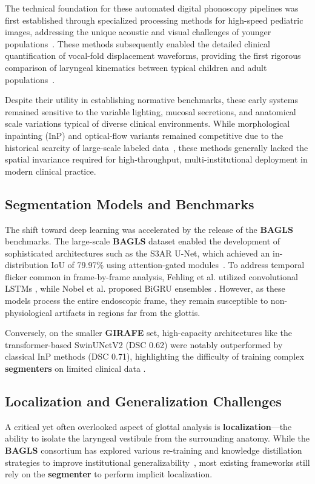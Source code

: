 \documentclass[preprint,12pt]{elsarticle}
\newcommand{\girafe}{\textbf{GIRAFE}}
\newcommand{\bagls}{\textbf{BAGLS}}
\begin{document}
The technical foundation for these automated digital phonoscopy pipelines was first
established through specialized processing methods for high-speed pediatric images,
addressing the unique acoustic and visual challenges of younger
populations~\cite{unnikrishnan2012photonic}. These methods subsequently enabled
the detailed clinical quantification of vocal-fold displacement waveforms,
providing the first rigorous comparison of laryngeal kinematics between typical children and adult populations~\cite{patel2015kinematic}. 

Despite their utility in establishing normative benchmarks, these early systems remained sensitive
to the variable lighting, mucosal secretions, and anatomical scale variations typical of diverse
clinical environments. While morphological inpainting (InP) and optical-flow variants remained
competitive due to the historical scarcity of large-scale labeled data~\cite{andrade2025datainbrief}, these methods
generally lacked the spatial invariance required for high-throughput, multi-institutional deployment
in modern clinical practice.

\subsection{Segmentation Models and Benchmarks}
The shift toward deep learning was accelerated by the release of the \bagls{} \cite{gomez2020bagls} benchmarks.
The large-scale \bagls{} dataset enabled the development of sophisticated architectures such as the
S3AR U-Net, which achieved an in-distribution IoU of \num{79.97}\% using attention-gated
modules~\cite{montalbo2024}. To address temporal flicker common in frame-by-frame analysis, Fehling et al. utilized convolutional LSTMs \cite{fehling2020convlstm}, while Nobel et al. proposed BiGRU ensembles \cite{nobel2024ensemble}. However, as these models process the entire endoscopic frame, they remain susceptible to non-physiological artifacts in regions far from the glottis.

Conversely, on the smaller \girafe{} set, high-capacity architectures like the transformer-based SwinUNetV2 (DSC \num{0.62}) were notably outperformed by classical InP methods (DSC \num{0.71}), highlighting the difficulty of training complex \textbf{segmenters} on limited clinical data \cite{andrade2025datainbrief}.

\subsection{Localization and Generalization Challenges}
A critical yet often overlooked aspect of glottal analysis is \textbf{localization}—the ability
to isolate the laryngeal vestibule from the surrounding anatomy. While the \bagls{} consortium
has explored various re-training and knowledge distillation strategies to improve institutional
generalizability~\cite{dollinger2022}, most existing frameworks still rely on the \textbf{segmenter}
to perform implicit localization.
\end{document}

